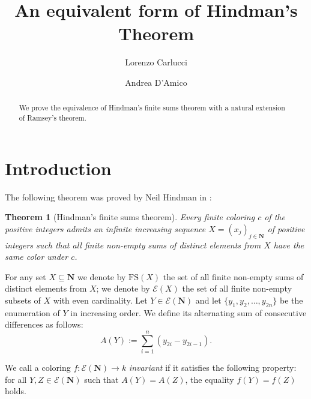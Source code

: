 \documentclass[11pt]{amsart}
\title{An equivalent form of Hindman's Theorem}
\author{Lorenzo Carlucci}
\author{Andrea D'Amico}
\date{}
\newcommand{\Nat}{\mathbf{N}}
\newcommand{\FS}{\mathrm{FS}}
\newtheorem*{theorem*}{Theorem}
\theoremstyle{definition}
\begin{document}
\begin{abstract}
We prove the equivalence of Hindman's finite sums theorem with a 
natural extension of Ramsey's theorem. 
\end{abstract}

\maketitle

\section{Introduction}
The following theorem was proved by Neil Hindman in \cite{Hin:74}: 

\begin{theorem*}[Hindman's finite sums theorem]
Every finite coloring $c$ of the positive integers admits an infinite increasing
sequence $X = (x_j)_{j \in\Nat}$ of positive integers such that all finite non-empty sums of distinct elements from $X$ have the same color under $c$.
\end{theorem*}


For any set $X\subseteq\Nat$ we denote by $\FS(X)$ the set of all finite non-empty sums of distinct elements from $X$; we denote by $\mathcal{E}(X)$ the set of all finite non-empty subsets of $X$ with even cardinality. Let $Y\in \mathcal{E}(\Nat)$ and let $\{y_1,y_2,\dots,y_{2n}\}$ be the enumeration of $Y$ in increasing order. We define its alternating sum of consecutive differences as follows:
 $$A(Y):=\sum_{i=1}^{n}(y_{2i}-y_{2i-1}).$$

We call a coloring $f: \mathcal{E}(\Nat) \to k$ {\em invariant} if it satisfies the following property: for all $Y, Z \in \mathcal{E}(\Nat)$ such that $A(Y) = A(Z)$, the equality $f(Y) = f(Z)$ holds. 

\end{document}

